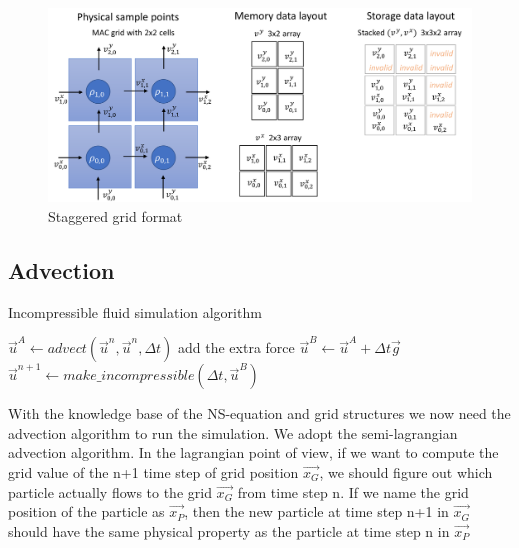 \documentclass[a4paper,12pt,twoside]{report}
\begin{document}
\begin{figure}[h]
\centering
\includegraphics[width=\textwidth]{Staggered.png}
\caption{Staggered grid format \cite{staggeredform}}
\end{figure}

\subsection{Advection}
\begin{algorithm}
	\caption{Incompressible fluid simulation algorithm}
\begin{algorithmic}
	\STATE $\vec{u}^{A} \gets advect(\vec{u}^{n}, \vec{u}^{n}, \Delta t)$
	\STATE add the extra force $\vec{u}^{B} \gets \vec{u}^{A} + \Delta t\vec{g}$
	\STATE $\vec{u}^{n+1} \gets make\_incompressible(\Delta t, \vec{u}^{B})$
	\ENDFOR
\end{algorithmic}
\end{algorithm}
With the knowledge base of the NS-equation and grid structures we now need the advection algorithm to run the simulation. We adopt the semi-lagrangian advection algorithm. In the lagrangian point of view, if we want to compute the grid value of the n+1 time step of grid position $\vec{x_G}$, we should figure out which particle actually flows to the grid $\vec{x_G}$ from time step n. If we name the grid position of the particle as $\vec{x_P}$, then the new particle at time step n+1 in $\vec{x_G}$ should have the same physical property as the particle at time step n in $\vec{x_P}$
\end{document}
